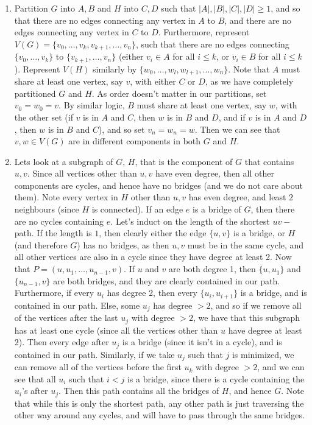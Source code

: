 \documentclass[10pt,english]{article}
\begin{document}
\begin{enumerate}
\begin{enumerate}
\end{enumerate}

\pagebreak
\item Partition $G$ into $A,B$ and $H$ into $C,D$ such that $|A|,|B|,|C|,|D|\geq1$, and so that there are no edges connecting any vertex in $A$ to $B$, and there are no edges connecting any vertex in $C$ to $D$. Furthermore, represent $V(G)=\{v_0,\ldots,v_k,v_{k+1},\ldots,v_n\}$, such that there are no edges connecting $\{v_0,\ldots,v_k\}$ to $\{v_{k+1},\ldots,v_n\}$ (either $v_i\in A$ for all $i\leq k$, or $v_i\in B$ for all $i\leq k$). Represent $V(H)$ similarly by $\{w_0,\ldots,w_l,w_{l+1},\ldots,w_n\}$. Note that $A$ must share at least one vertex, say $v$, with either $C$ or $D$, as we have completely partitioned $G$ and $H$. As order doesn't matter in our partitions, set $v_0=w_0=v$. By similar logic, $B$ must share at least one vertex, say $w$, with the other set (if $v$ is in $A$ and $C$, then $w$ is in $B$ and $D$, and if $v$ is in $A$ and $D$, then $w$ is in $B$ and $C$), and so set $v_n=w_n=w$. Then we can see that $v,w\in V(G)$ are in different components in both $G$ and $H$.

\pagebreak
\item Lets look at a subgraph of $G$, $H$, that is the component of $G$ that contains $u,v$. Since all vertices other than $u,v$ have even degree, then all other components are cycles, and hence have no bridges (and we do not care about them). Note every vertex in $H$ other than $u,v$ has even degree, and least $2$ neighbours (since $H$ is connected). If an edge $e$ is a bridge of $G$, then there are no cycles containing $e$. Let's induct on the length of the shortest $uv-$path. If the length is $1$, then clearly either the edge $\{u,v\}$ is a bridge, or $H$ (and therefore $G$) has no bridges, as then $u,v$ must be in the same cycle, and all other vertices are also in a cycle since they have degree at least 2. Now that $P=(u,u_{1},\ldots,u_{n-1},v)$. If $u$ and $v$ are both degree 1, then $\{u,u_{1}\}$ and $\{u_{n-1},v\}$ are both bridges, and they are clearly contained in our path. Furthermore, if every $u_i$ has degree 2, then every $\{u_{i},u_{i+1}\}$ is a bridge, and is contained in our path. Else, some $u_j$ has degree $>2$, and so if we remove all of the vertices after the last $u_j$ with degree $>2$, we have that this subgraph has at least one cycle (since all the vertices other than $u$ have degree at least 2). Then every edge after $u_j$ is a bridge (since it isn't in a cycle), and is contained in our path. Similarly, if we take $u_j$ such that $j$ is minimized, we can remove all of the vertices before the first $u_k$ with degree $>2$, and we can see that all $u_i$ such that $i<j$ is a bridge, since there is a cycle containing the $u_i$'s after $u_j$. Then this path contains all the bridges of $H$, and hence $G$. Note that while this is only the shortest path, any other path is just traversing the other way around any cycles, and will have to pass through the same bridges. 



\end{enumerate}
\end{document}
